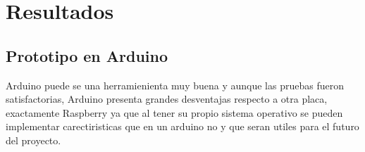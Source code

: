 \begin{comment} 
Se puede observar en la imagen \ref{evento1} que, cuando el sensor de humedad del suelo reporta valores altos, el riego se detiene en el momento. 

\begin{figure}[H]
	\begin{center}
		\subfigure[Detecci\'on de un nivel alto de humedad del suelo.]{\texttt{[image: r4]}}
		\subfigure[Riego detenido.]{\texttt{[image: r4]}}
	\end{center}
	\label{evento1}
	\caption{Primera evento considerado.}
\end{figure} 

En caso de que se detecten valores bajos de humedad en el suelo como en la imagen \ref{evento2}, el riego dar\'a inicio de manera autom\'atica. 

\begin{figure}[H]
	\begin{center}
		\subfigure[Detecci\'on de un nivel bajo de humedad del suelo.]{\texttt{[image: r4]}}
		\subfigure[Riego detenido.]{\texttt{[image: r4]}}
	\end{center}
	\label{evento2}
	\caption{Segundo evento considerado.}
\end{figure} 

Otra forma de detener el flujo de agua, es detectando un nivel de agua bajo parecido al de la imagen \ref{event3}.  

\begin{figure}[H]
	\begin{center}
		\subfigure[Detecci\'on de un bajo nivel de agua.]{\texttt{[image: r4]}}
		\subfigure[Riego detenido.]{\texttt{[image: r4]}}
	\end{center}
	\label{event3}
	\caption{Tercer evento considerado.}
\end{figure} 

\end{comment}

\section{Resultados}
\subsection{Prototipo en Arduino}
Arduino puede se una herramienienta muy buena y aunque las pruebas fueron satisfactorias, Arduino presenta grandes desventajas respecto a otra placa, exactamente Raspberry ya que al tener su propio sistema operativo se pueden implementar carectiristicas que en un arduino no y que seran utiles para el futuro del proyecto.

